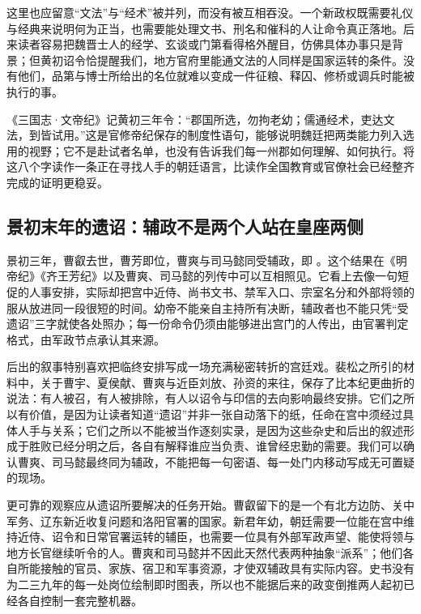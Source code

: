 这里也应留意“文法”与“经术”被并列，而没有被互相吞没。一个新政权既需要礼仪与经典来说明何为正当，也需要能处理文书、刑名和催科的人让命令真正落地。后来读者容易把魏晋士人的经学、玄谈或门第看得格外醒目，仿佛具体办事只是背景；但黄初诏令恰提醒我们，地方官府里能通文法的人同样是国家运转的条件。没有他们，品第与博士所给出的名位就难以变成一件征粮、释囚、修桥或调兵时能被执行的事。

\begin{textwindow}
《三国志·文帝纪》记黄初三年令：“郡国所选，勿拘老幼；儒通经术，吏达文法，到皆试用。”这是官修帝纪保存的制度性语句，能够说明魏廷把两类能力列入选用的视野；它不是赴试者名单，也没有告诉我们每一州郡如何理解、如何执行。将这八个字读作一条正在寻找人手的朝廷语言，比读作全国教育或官僚社会已经整齐完成的证明更稳妥。
\end{textwindow}

\subsection{景初末年的遗诏：辅政不是两个人站在皇座两侧}

景初三年，曹叡去世，曹芳即位，曹爽与司马懿同受辅政，即
。这个结果在《明帝纪》《齐王芳纪》以及曹爽、司马懿的列传中可以互相照见。它看上去像一句短促的人事安排，实际却把宫中近侍、尚书文书、禁军入口、宗室名分和外部将领的服从放进同一段很短的时间。幼帝不能亲自主持所有决断，辅政者也不能只凭“受遗诏”三字就使各处照办；每一份命令仍须由能够进出宫门的人传出，由官署判定格式，由军政节点承认其来源。

后出的叙事特别喜欢把临终安排写成一场充满秘密转折的宫廷戏。裴松之所引的材料中，关于曹宇、夏侯献、曹爽与近臣刘放、孙资的来往，保存了比本纪更曲折的说法：有人被召，有人被排除，有人以诏令与印信的去向影响最终安排。它们之所以有价值，是因为让读者知道“遗诏”并非一张自动落下的纸，任命在宫中须经过具体人手与关系；它们之所以不能被当作逐刻实录，是因为这些杂史和后出的叙述形成于胜败已经分明之后，各自有解释谁应当负责、谁曾经忠勤的需要。我们可以确认曹爽、司马懿最终同为辅政，不能把每一句密语、每一处门内移动写成无可置疑的现场。

更可靠的观察应从遗诏所要解决的任务开始。曹叡留下的是一个有北方边防、关中军务、辽东新近收复问题和洛阳官署的国家。新君年幼，朝廷需要一位能在宫中维持近侍、诏令和日常官署运转的辅臣，也需要一位具有外部军政声望、能使将领与地方长官继续听令的人。曹爽和司马懿并不因此天然代表两种抽象“派系”；他们各自所能接触的官员、家族、宿卫和军事资源，才使双辅政具有实际内容。史书没有为二三九年的每一处岗位绘制即时图表，所以也不能据后来的政变倒推两人起初已经各自控制一套完整机器。

